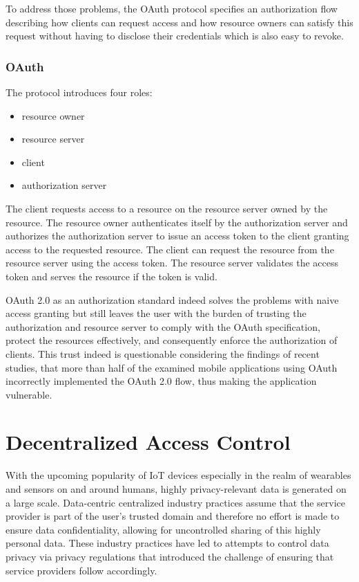 \documentclass[conference]{IEEEtran}
\begin{document}
To address those problems, the OAuth protocol specifies an authorization flow describing how clients can request access and how resource owners can satisfy this request without having to disclose their credentials which is also easy to revoke. \cite{hardt_oauth_2012}

\subsubsection*{OAuth}
The protocol introduces four roles:

\begin{itemize}
  \item resource owner
  \item resource server
  \item client
  \item authorization server
\end{itemize}

The client requests access to a resource on the resource server owned by the resource.
The resource owner authenticates itself by the authorization server and authorizes the authorization server to issue an access token to the client granting access to the requested resource.
The client can request the resource from the resource server using the access token.
The resource server validates the access token and serves the resource if the token is valid.

OAuth 2.0 as an authorization standard indeed solves the problems with naive access granting but still leaves the user with the burden of trusting the authorization and resource server to comply with the OAuth specification, protect the resources effectively, and consequently enforce the authorization of clients.
This trust indeed is questionable considering the findings of recent studies, that more than half of the examined mobile applications using OAuth incorrectly implemented the OAuth 2.0 flow, thus making the application vulnerable. \cite{chen_oauth_2014}

\section{Decentralized Access Control}
With the upcoming popularity of IoT devices especially in the realm of wearables and sensors on and around humans, highly privacy-relevant data is generated on a large scale. \cite{zhang_cloud_2015}
Data-centric centralized industry practices assume that the service provider is part of the user's trusted domain and therefore no effort is made to ensure data confidentiality, allowing for uncontrolled sharing of this highly personal data. \cite{shafagh_droplet_2020}
These industry practices have led to attempts to control data privacy via privacy regulations that introduced the challenge of ensuring that service providers follow accordingly. \cite{noauthor_general_nodate}
\end{document}
